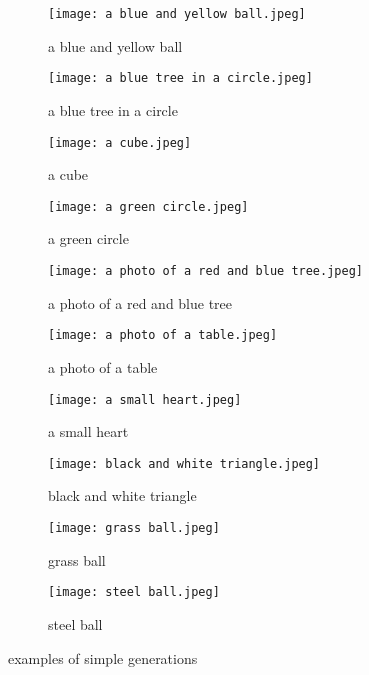 \documentclass{article}
\begin{document}
\begin{appendix}
\begin{figure}[H]
\begin{subfigure}{.5\textwidth}
  \centering
  \texttt{[image: a blue and yellow ball.jpeg]}
  \caption{a blue and yellow ball}
  \label{fig:a blue and yellow ball.}
\end{subfigure}
\begin{subfigure}{.5\textwidth}
  \centering
  \texttt{[image: a blue tree in a circle.jpeg]}
  \caption{a blue tree in a circle}
  \label{fig:a blue tree in a circle}
\end{subfigure}
\begin{subfigure}{.5\textwidth}
  \centering
  \texttt{[image: a cube.jpeg]}
  \caption{a cube}
  \label{fig:a cube}
\end{subfigure}
\begin{subfigure}{.5\textwidth}
  \centering
  \texttt{[image: a green circle.jpeg]}
  \caption{a green circle}
  \label{fig:a green circle}
\end{subfigure}
\begin{subfigure}{.5\textwidth}
  \centering
  \texttt{[image: a photo of a red and blue tree.jpeg]}
  \caption{a photo of a red and blue tree}
  \label{fig:a photo of a red and blue tree}
\end{subfigure}
\begin{subfigure}{.5\textwidth}
  \centering
  \texttt{[image: a photo of a table.jpeg]}
  \caption{a photo of a table}
  \label{fig:a photo of a table}
\end{subfigure}
\begin{subfigure}{.5\textwidth}
  \centering
  \texttt{[image: a small heart.jpeg]}
  \caption{a small heart}
  \label{fig:a small heart}
\end{subfigure}
\begin{subfigure}{.5\textwidth}
  \centering
  \texttt{[image: black and white triangle.jpeg]}
  \caption{black and white triangle}
  \label{fig:black and white triangle}
\end{subfigure}
\begin{subfigure}{.5\textwidth}
  \centering
  \texttt{[image: grass ball.jpeg]}
  \caption{grass ball}
  \label{fig:grass ball}
\end{subfigure}
\begin{subfigure}{.5\textwidth}
  \centering
  \texttt{[image: steel ball.jpeg]}
  \caption{steel ball}
  \label{fig:steel ball}
\end{subfigure}
\caption{examples of simple generations}
\label{fig:first_generations}
\end{figure}



\end{appendix}
\end{document}
